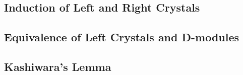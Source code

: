 \documentclass{article}
\begin{document}
  \subsection{Induction of Left and Right Crystals}

  \subsection{Equivalence of Left Crystals and D-modules}

  \subsection{Kashiwara's Lemma}



\end{document}
